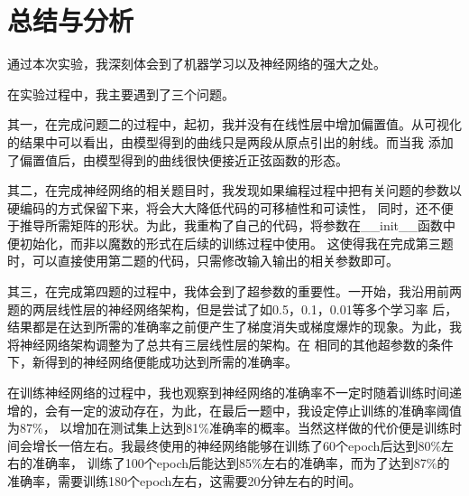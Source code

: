 \chapter{总结与分析}
%
%
通过本次实验，我深刻体会到了机器学习以及神经网络的强大之处。

在实验过程中，我主要遇到了三个问题。

其一，在完成问题二的过程中，起初，我并没有在线性层中增加偏置值。从可视化的结果中可以看出，由模型得到的曲线只是两段从原点引出的射线。而当我
添加了偏置值后，由模型得到的曲线很快便接近正弦函数的形态。

其二，在完成神经网络的相关题目时，我发现如果编程过程中把有关问题的参数以硬编码的方式保留下来，将会大大降低代码的可移植性和可读性，
同时，还不便于推导所需矩阵的形状。为此，我重构了自己的代码，将参数在\_\_init\_\_函数中便初始化，而非以魔数的形式在后续的训练过程中使用。
这使得我在完成第三题时，可以直接使用第二题的代码，只需修改输入输出的相关参数即可。

其三，在完成第四题的过程中，我体会到了超参数的重要性。一开始，我沿用前两题的两层线性层的神经网络架构，但是尝试了如0.5，0.1，0.01等多个学习率
后，结果都是在达到所需的准确率之前便产生了梯度消失或梯度爆炸的现象。为此，我将神经网络架构调整为了总共有三层线性层的架构。在
相同的其他超参数的条件下，新得到的神经网络便能成功达到所需的准确率。

在训练神经网络的过程中，我也观察到神经网络的准确率不一定时随着训练时间递增的，会有一定的波动存在，为此，在最后一题中，我设定停止训练的准确率阈值为87\%，
以增加在测试集上达到81\%准确率的概率。当然这样做的代价便是训练时间会增长一倍左右。我最终使用的神经网络能够在训练了60个epoch后达到80\%左右的准确率，
训练了100个epoch后能达到85\%左右的准确率，而为了达到87\%的准确率，需要训练180个epoch左右，这需要20分钟左右的时间。